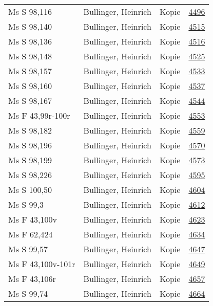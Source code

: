 \documentclass[10pt,a4paper,landscape]{report}
\begin{document}
\begin{longtable}{p{16cm}p{4cm}lr}
Ms S 98,116	&	Bullinger, Heinrich	&	Kopie	&	\href{http://130.60.24.72/assignment/4496}{4496}\\
Ms S 98,140	&	Bullinger, Heinrich	&	Kopie	&	\href{http://130.60.24.72/assignment/4515}{4515}\\
Ms S 98,136	&	Bullinger, Heinrich	&	Kopie	&	\href{http://130.60.24.72/assignment/4516}{4516}\\
Ms S 98,148	&	Bullinger, Heinrich	&	Kopie	&	\href{http://130.60.24.72/assignment/4525}{4525}\\
Ms S 98,157	&	Bullinger, Heinrich	&	Kopie	&	\href{http://130.60.24.72/assignment/4533}{4533}\\
Ms S 98,160	&	Bullinger, Heinrich	&	Kopie	&	\href{http://130.60.24.72/assignment/4537}{4537}\\
Ms S 98,167	&	Bullinger, Heinrich	&	Kopie	&	\href{http://130.60.24.72/assignment/4544}{4544}\\
Ms F 43,99r-100r	&	Bullinger, Heinrich	&	Kopie	&	\href{http://130.60.24.72/assignment/4553}{4553}\\
Ms S 98,182	&	Bullinger, Heinrich	&	Kopie	&	\href{http://130.60.24.72/assignment/4559}{4559}\\
Ms S 98,196	&	Bullinger, Heinrich	&	Kopie	&	\href{http://130.60.24.72/assignment/4570}{4570}\\
Ms S 98,199	&	Bullinger, Heinrich	&	Kopie	&	\href{http://130.60.24.72/assignment/4573}{4573}\\
Ms S 98,226	&	Bullinger, Heinrich	&	Kopie	&	\href{http://130.60.24.72/assignment/4595}{4595}\\
Ms S 100,50	&	Bullinger, Heinrich	&	Kopie	&	\href{http://130.60.24.72/assignment/4604}{4604}\\
Ms S 99,3	&	Bullinger, Heinrich	&	Kopie	&	\href{http://130.60.24.72/assignment/4612}{4612}\\
Ms F 43,100v	&	Bullinger, Heinrich	&	Kopie	&	\href{http://130.60.24.72/assignment/4623}{4623}\\
Ms F 62,424	&	Bullinger, Heinrich	&	Kopie	&	\href{http://130.60.24.72/assignment/4634}{4634}\\
Ms S 99,57	&	Bullinger, Heinrich	&	Kopie	&	\href{http://130.60.24.72/assignment/4647}{4647}\\
Ms F 43,100v-101r	&	Bullinger, Heinrich	&	Kopie	&	\href{http://130.60.24.72/assignment/4649}{4649}\\
Ms F 43,106r	&	Bullinger, Heinrich	&	Kopie	&	\href{http://130.60.24.72/assignment/4657}{4657}\\
Ms S 99,74	&	Bullinger, Heinrich	&	Kopie	&	\href{http://130.60.24.72/assignment/4664}{4664}\\

\end{longtable}
\end{document}
